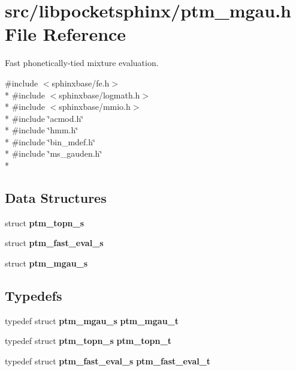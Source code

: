 \section{src/libpocketsphinx/ptm\-\_\-mgau.h File Reference}
\label{ptm__mgau_8h}


Fast phonetically-\/tied mixture evaluation.  


{\ttfamily \#include $<$sphinxbase/fe.\-h$>$}\\*
{\ttfamily \#include $<$sphinxbase/logmath.\-h$>$}\\*
{\ttfamily \#include $<$sphinxbase/mmio.\-h$>$}\\*
{\ttfamily \#include \char`\"{}acmod.\-h\char`\"{}}\\*
{\ttfamily \#include \char`\"{}hmm.\-h\char`\"{}}\\*
{\ttfamily \#include \char`\"{}bin\-\_\-mdef.\-h\char`\"{}}\\*
{\ttfamily \#include \char`\"{}ms\-\_\-gauden.\-h\char`\"{}}\\*
\subsection*{Data Structures}
\begin{DoxyCompactItemize}
\item 
struct {\bf ptm\-\_\-topn\-\_\-s}
\item 
struct {\bf ptm\-\_\-fast\-\_\-eval\-\_\-s}
\item 
struct {\bf ptm\-\_\-mgau\-\_\-s}
\end{DoxyCompactItemize}
\subsection*{Typedefs}
\begin{DoxyCompactItemize}
\item 
typedef struct {\bf ptm\-\_\-mgau\-\_\-s} {\bfseries ptm\-\_\-mgau\-\_\-t}\label{ptm__mgau_8h_ab1e3230da8b59628476ecdf70e97ec9a}

\item 
typedef struct {\bf ptm\-\_\-topn\-\_\-s} {\bfseries ptm\-\_\-topn\-\_\-t}\label{ptm__mgau_8h_a4542a2b38a0c0b8ea62432f63fa3c921}

\item 
typedef struct {\bf ptm\-\_\-fast\-\_\-eval\-\_\-s} {\bfseries ptm\-\_\-fast\-\_\-eval\-\_\-t}\label{ptm__mgau_8h_af870ed22578ba58631d06a1c01752ced}

\end{DoxyCompactItemize}
